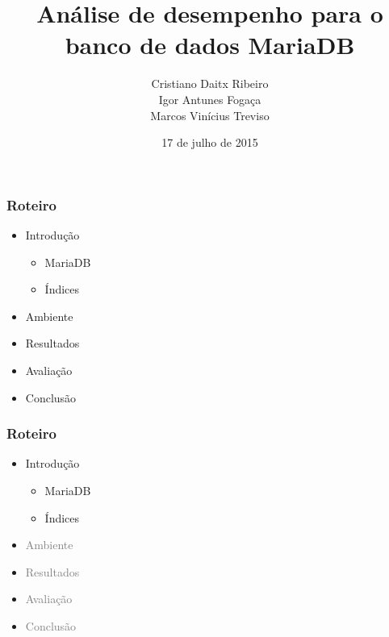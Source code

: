 \documentclass[10pt]{beamer}
\title{Análise de desempenho para o banco de dados MariaDB}
\subtitle{}
\date{17 de julho de 2015}
\author[Treviso]{Cristiano Daitx Ribeiro\\Igor Antunes Fogaça\\Marcos Vinícius Treviso\\}
\institute{Banco de Dados II - Universidade Federal do Pampa}
\begin{document}
\maketitle


\begin{frame}
  \frametitle{Roteiro}

  \begin{itemize}

    \item Introdução
    
    \begin{itemize}
      \item[\ ] MariaDB
      \item[\ ] Índices
    \end{itemize}


    \item Ambiente

    \item Resultados

    \item Avaliação

    \item Conclusão

  \end{itemize}

\end{frame}



\begin{frame}
  \frametitle{Roteiro}

  \begin{itemize}

    \item Introdução
    
    \begin{itemize}
      \item[\ ] MariaDB
      \item[\ ] Índices
    \end{itemize}


    \item[\color{gray}{$\bullet$}] \textcolor{gray}{Ambiente}

    \item[\color{gray}{$\bullet$}] \textcolor{gray}{Resultados}

    \item[\color{gray}{$\bullet$}] \textcolor{gray}{Avaliação}

    \item[\color{gray}{$\bullet$}] \textcolor{gray}{Conclusão}

  \end{itemize}

\end{frame}
\end{document}
